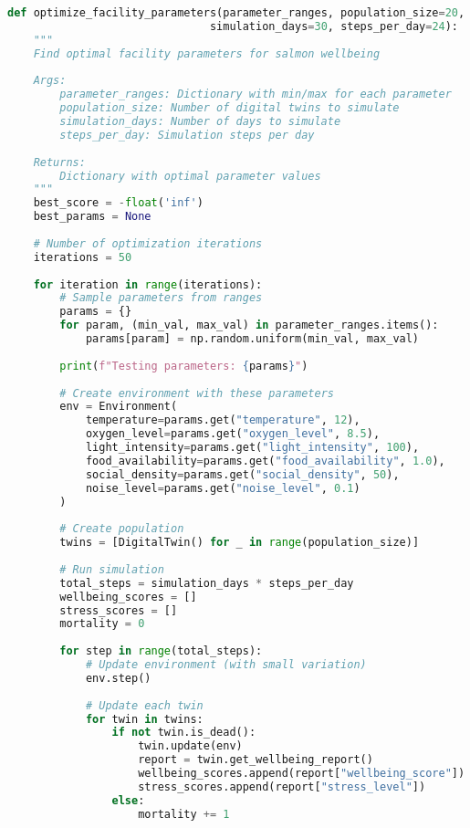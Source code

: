 \documentclass[11pt,a4paper]{article}
\begin{document}
\begin{lstlisting}[language=Python]
def optimize_facility_parameters(parameter_ranges, population_size=20, 
                               simulation_days=30, steps_per_day=24):
    """
    Find optimal facility parameters for salmon wellbeing
    
    Args:
        parameter_ranges: Dictionary with min/max for each parameter
        population_size: Number of digital twins to simulate
        simulation_days: Number of days to simulate
        steps_per_day: Simulation steps per day
        
    Returns:
        Dictionary with optimal parameter values
    """
    best_score = -float('inf')
    best_params = None
    
    # Number of optimization iterations
    iterations = 50
    
    for iteration in range(iterations):
        # Sample parameters from ranges
        params = {}
        for param, (min_val, max_val) in parameter_ranges.items():
            params[param] = np.random.uniform(min_val, max_val)
            
        print(f"Testing parameters: {params}")
        
        # Create environment with these parameters
        env = Environment(
            temperature=params.get("temperature", 12),
            oxygen_level=params.get("oxygen_level", 8.5),
            light_intensity=params.get("light_intensity", 100),
            food_availability=params.get("food_availability", 1.0),
            social_density=params.get("social_density", 50),
            noise_level=params.get("noise_level", 0.1)
        )
        
        # Create population
        twins = [DigitalTwin() for _ in range(population_size)]
        
        # Run simulation
        total_steps = simulation_days * steps_per_day
        wellbeing_scores = []
        stress_scores = []
        mortality = 0
        
        for step in range(total_steps):
            # Update environment (with small variation)
            env.step()
            
            # Update each twin
            for twin in twins:
                if not twin.is_dead():
                    twin.update(env)
                    report = twin.get_wellbeing_report()
                    wellbeing_scores.append(report["wellbeing_score"])
                    stress_scores.append(report["stress_level"])
                else:
                    mortality += 1
                    

\end{lstlisting}
\end{document}
